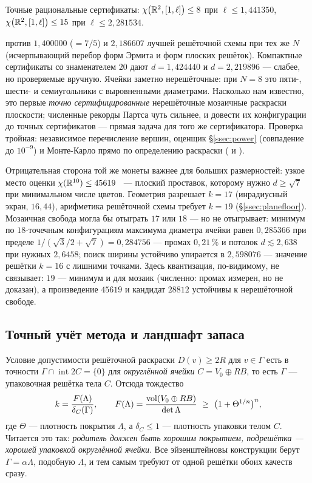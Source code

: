 \begin{keybox}
Точные рациональные сертификаты:\quad
$\chi\bigl(\mathbb{R}^2,[1,\ell]\bigr)\le8$ при $\ell\le1{,}441350$,\qquad
$\chi\bigl(\mathbb{R}^2,[1,\ell]\bigr)\le15$ при $\ell\le2{,}281534$.
\end{keybox}

\noindent против $1{,}400000$ ($=7/5$) и $2{,}186607$ лучшей решёточной схемы
при тех же $N$ (исчерпывающий перебор форм Эрмита и форм плоских решёток).
Компактные сертификаты со знаменателем $20$ дают $d=1{,}424440$ и
$d=2{,}219896$ --- слабее, но проверяемые вручную. Ячейки заметно
нерешёточные: при $N=8$ это пяти-, шести- и семиугольники с выровненными
диаметрами. Насколько нам известно, это первые \emph{точно
сертифицированные} нерешёточные мозаичные раскраски плоскости; численные
рекорды Партса чуть сильнее, и довести их конфигурации до точных
сертификатов --- прямая задача для того же сертификатора. Проверка тройная:
независимое перечисление вершин, оценщик \S\ref{ssec:power} (совпадение до
$10^{-9}$) и Монте-Карло прямо по определению раскраски
( и
).

Отрицательная сторона той же монеты важнее для больших размерностей: узкое
место оценки $\chi(\mathbb{R}^{10})\le45619$~\cite{Bounds} --- плоский проставок,
которому нужно $d\ge\sqrt7$ при минимальном числе цветов. Геометрия разрешает
$k=17$ (инрадиусный экран, $16{,}44$), арифметика решёточной схемы требует
$k=19$ (\S\ref{ssec:planefloor}). Мозаичная свобода могла бы отыграть $17$ или
$18$ --- но не отыгрывает: минимум по $18$-точечным конфигурациям максимума
диаметра ячейки равен $0{,}285366$ при пределе
$1/(\sqrt3/2+\sqrt7)=0{,}284756$ --- промах $0{,}21\,\%$ и потолок
$d\lesssim2{,}638$ при нужных $2{,}6458$; поиск ширины устойчиво упирается в
$2{,}598076$ --- значение решётки $k=16$ с лишними точками. Здесь квантизация,
по-видимому, не связывает: $19$ --- минимум и для мозаик (численно: промах
измерен, но не доказан), а произведение $45619$ и кандидат $28812$ устойчивы к
нерешёточной свободе.

\subsection{Точный учёт метода и ландшафт запаса}
\label{ssec:accounting}

Условие допустимости решёточной раскраски $D(v)\ge2R$ для $v\in\Gamma$ есть в
точности $\Gamma\cap\operatorname{int}2C=\{0\}$ для \emph{округлённой ячейки}
$C=V_0\oplus RB$, то есть $\Gamma$ --- упаковочная решётка тела $C$. Отсюда
тождество
\begin{equation}\label{eq:accounting}
k=\frac{F(\Lambda)}{\delta_C(\Gamma)},\qquad
F(\Lambda)=\frac{\vol(V_0\oplus RB)}{\det\Lambda}\ \ge\ \bigl(1+\Theta^{1/n}\bigr)^n,
\end{equation}
где $\Theta$ --- плотность покрытия $\Lambda$, а $\delta_C\le1$ --- плотность
упаковки телом $C$. Читается это так: \emph{родитель должен быть хорошим
покрытием, подрешётка --- хорошей упаковкой округлённой ячейки}. Все
эйзенштейновы конструкции берут $\Gamma=\alpha\Lambda$, подобную $\Lambda$, и
тем самым требуют от одной решётки обоих качеств сразу.

